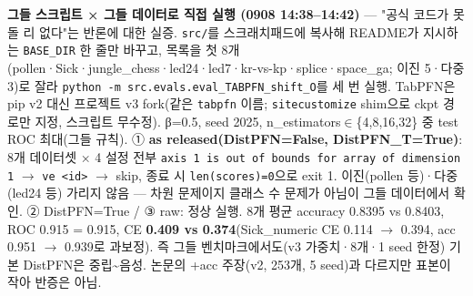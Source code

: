 \par\noindent \textbullet\enspace \textbf{그들 스크립트 × 그들 데이터로 직접 실행 (0908 14:38–14:42)} — "공식 코드가 못 돌 리 없다"는 반론에 대한 실증. \texttt{src/\allowbreak{}\allowbreak{}}를 스크래치패드에 복사해 README가 지시하는 \texttt{BASE\_\allowbreak{}\allowbreak{}DIR\allowbreak{}} 한 줄만 바꾸고, 목록을 첫 8개(pollen·Sick·jungle\_\allowbreak{}chess·led24·led7·kr-vs-kp·splice·space\_\allowbreak{}ga; 이진 5·다중 3)로 잘라 \texttt{python -\allowbreak{}m src.\allowbreak{}ev\allowbreak{}als.\allowbreak{}eval\allowbreak{}\_\allowbreak{}\allowbreak{}TABPFN\_\allowbreak{}\allowbreak{}shift\_\allowbreak{}\allowbreak{}O}를 세 번 실행. TabPFN은 pip v2 대신 프로젝트 v3 fork(같은 \texttt{tabpfn} 이름; \texttt{sitecust\allowbreak{}omize} shim으로 ckpt 경로만 지정, 스크립트 무수정). β=\allowbreak{}0.5, seed 2025, n\_\allowbreak{}estimators\ensuremath{\in}\{4,8,16,32\} 중 test ROC 최대(그들 규칙). ① \textbf{as released(DistPFN=\allowbreak{}False, DistPFN\_\allowbreak{}T=\allowbreak{}True)}: 8개 데이터셋 × 4 설정 전부 \texttt{axis 1 i\allowbreak{}s out of\allowbreak{} bounds \allowbreak{}for arra\allowbreak{}y of dim\allowbreak{}ension 1\allowbreak{}}  \ensuremath{\rightarrow}  \texttt{ve <id>}  \ensuremath{\rightarrow}  skip, 종료 시 \texttt{len(scor\allowbreak{}es)=\allowbreak{}\allowbreak{}0}으로 exit 1. 이진(pollen 등)·다중(led24 등) 가리지 않음 — 차원 문제이지 클래스 수 문제가 아님이 그들 데이터에서 확인. ② DistPFN=\allowbreak{}True /\allowbreak{} ③ raw: 정상 실행. 8개 평균 accuracy 0.8395 vs 0.8403, ROC 0.915 =\allowbreak{} 0.915, CE \textbf{0.409 vs 0.374}(Sick\_\allowbreak{}numeric CE 0.114 \ensuremath{\rightarrow} 0.394, acc 0.951 \ensuremath{\rightarrow} 0.939로 과보정). 즉 그들 벤치마크에서도(v3 가중치·8개·1 seed 한정) 기본 DistPFN은 중립\textasciitilde{}음성. 논문의 +\allowbreak{}acc 주장(v2, 253개, 5 seed)과 다르지만 표본이 작아 반증은 아님.



